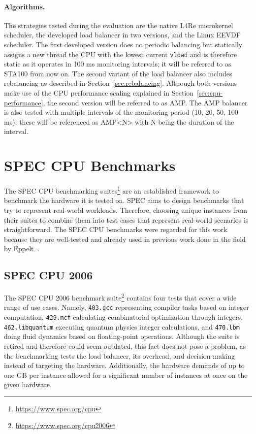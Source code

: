 \paragraph{Algorithms.}

The strategies tested during the evaluation are the native L4Re microkernel scheduler, the developed load balancer in two versions, and the Linux EEVDF scheduler.
The first developed version does no periodic balancing but statically assigns a new thread the CPU with the lowest current \texttt{vload} and is therefore static as it operates in 100 \si{\ms} monitoring intervals; it will be referred to as STA100 from now on.
The second variant of the load balancer also includes rebalancing as described in Section~\ref{sec:rebalancing}.
Although both versions make use of the CPU performance scaling explained in Section~\ref{sec:cpu-performance}, the second version will be referred to as AMP.
The AMP balancer is also tested with multiple intervals of the monitoring period (10, 20, 50, 100 \si{\ms}); these will be referenced as AMP<N> with N being the duration of the interval.

\section{SPEC CPU Benchmarks}

The SPEC CPU benchmarking suites\footnote{\url{https://www.spec.org/cpu}} are an established framework to benchmark the hardware it is tested on.
SPEC aims to design benchmarks that try to represent real-world workloads.
Therefore, choosing unique instances from their suites to combine them into test cases that represent real-world scenarios is straightforward.
The SPEC CPU benchmarks were regarded for this work because they are well-tested and already used in previous work done in the field by Eppelt~\cite{philipp-thesis}.

\subsection{SPEC CPU 2006}

The SPEC CPU 2006 benchmark suite\footnote{\url{https://www.spec.org/cpu2006}} contains four tests that cover a wide range of use cases.
Namely, \texttt{403.gcc} representing compiler tasks based on integer computation, \texttt{429.mcf} calculating combinatorial optimization through integers, \texttt{462.libquantum} executing quantum physics integer calculations, and \texttt{470.lbm} doing fluid dynamics based on floating-point operations.
Although the suite is retired and therefore could seem outdated, this fact does not pose a problem, as the benchmarking tests the load balancer, its overhead, and decision-making instead of targeting the hardware.
Additionally, the hardware demands of up to one GB per instance allowed for a significant number of instances at once on the given hardware.

